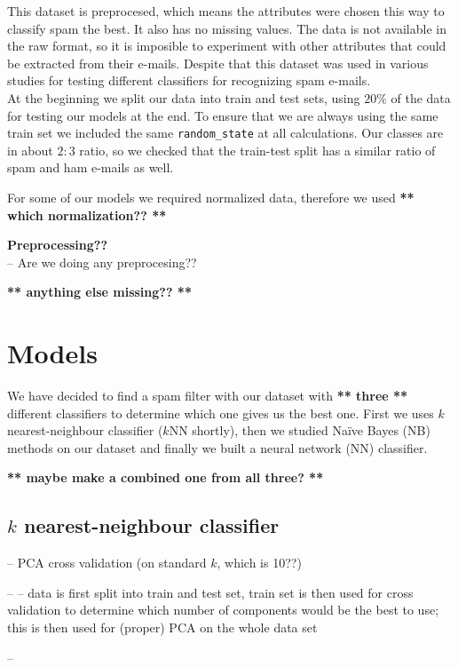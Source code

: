 \documentclass[12pt,a4paper]{article}
\begin{document}
This dataset is preprocesed, which means the attributes were chosen this way to classify spam the best. It also has no missing values. The data is not available in the raw format, so it is imposible to experiment with other attributes that could be extracted from their e-mails. Despite that this dataset was used in various studies for testing different classifiers for recognizing spam e-mails.\\

At the beginning we split our data into train and test sets, using $20\%$ of the data for testing our models at the end. To ensure that we are always using the same train set we included the same {\tt random\_state} at all calculations. 
Our classes are in about $2:3$ ratio, so we checked that the train-test split has a similar ratio of spam and ham e-mails as well.

For some of our models we required normalized data, therefore we used \textbf{** which normalization?? **}


\bigskip
\textbf{Preprocessing??}\\
-- Are we doing any preprocesing??

\bigskip
\textbf{** anything else missing?? **}


\section{Models}
\label{sec-models}

We have decided to find a spam filter with our dataset with \textbf{** three **} different classifiers to determine which one gives us the best one. First we uses $k$ nearest-neighbour classifier ($k$NN shortly), then we studied Na\"ive Bayes (NB) methods on our dataset and finally we built a neural network (NN) classifier.

\textbf{** maybe make a combined one from all three? **}

\subsection{$k$ nearest-neighbour classifier}

-- PCA cross validation (on standard $k$, which is 10??)

-- -- data is first split into train and test set, train set is then used for cross validation to determine which number of components would be the best to use; this is then used for (proper) PCA on the whole data set

-- 
\end{document}
